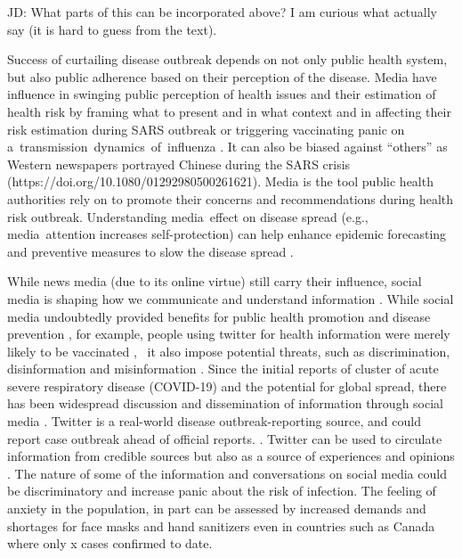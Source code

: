 
JD: What parts of this can be incorporated above? I am curious what \cite{BascHill20, SunYang20} actually say (it is hard to guess from the text).

Success of curtailing disease outbreak depends on not only public health system, but also public adherence based on their perception of the disease.  Media have influence in swinging public perception of health issues and their estimation of health risk by framing what to present and in what context and in affecting their risk estimation during SARS outbreak \citep{BerrWalf07} or triggering vaccinating panic on a transmission dynamics of influenza \citep{TuchDube11}.  It can also be biased against “others” as Western newspapers portrayed Chinese during the SARS crisis \citep{HuanLeun06} (https://doi.org/10.1080/01292980500261621).  Media is the tool public health authorities rely on to promote their concerns and recommendations during health risk outbreak.  Understanding media effect on disease spread (e.g., media attention increases self-protection) can help enhance epidemic forecasting and preventive measures to slow the disease spread \citep{KimFast19}.  

While news media (due to its online virtue) still carry their influence, social media is shaping how we communicate and understand information \citep{LiuSieg19}.  While social media undoubtedly provided benefits for public health promotion and disease prevention \cite{BascHill20, SunYang20}, for example, people using twitter for health information were merely likely to be vaccinated \citep{AhmeQuin18},  it also impose potential threats, such as discrimination, disinformation and misinformation \citep{ChouOa18, McKevanS19}.  Since the initial reports of cluster of acute severe respiratory disease (COVID-19) and the potential for global spread, there has been widespread discussion and dissemination of information through social media \citep{?}.  Twitter is a real-world disease outbreak-reporting source, and could report case outbreak ahead of official reports. \citep{YoutDara19}.  Twitter can be used to circulate information from credible sources but also as a source of experiences and opinions \citep{ChewEyes10}.  The nature of some of the information and conversations on social media could be discriminatory and increase panic about the risk of infection. The feeling of anxiety in the population, in part can be assessed by increased demands and shortages for face masks and hand sanitizers even in countries such as Canada where only x cases confirmed to date. 

